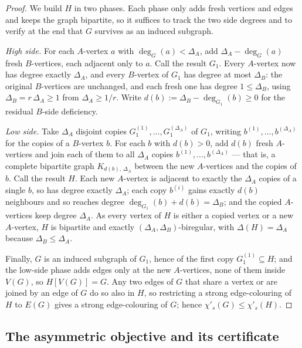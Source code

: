 \documentclass[11pt,a4paper]{article}
\theoremstyle{definition}
\theoremstyle{remark}
\begin{document}
\begin{proof}
We build $H$ in two phases. Each phase only adds fresh vertices and
edges and keeps the graph bipartite, so it suffices to track the two
side degrees and to verify at the end that $G$ survives as an induced
subgraph.

\emph{High side.} For each $A$-vertex $a$ with $\deg_G(a) < \Delta_A$,
add $\Delta_A - \deg_G(a)$ fresh $B$-vertices, each adjacent only to
$a$. Call the result $G_1$. Every $A$-vertex now has degree exactly
$\Delta_A$, and every $B$-vertex of $G_1$ has degree at most
$\Delta_B$: the original $B$-vertices are unchanged, and each fresh one
has degree $1 \leq \Delta_B$, using $\Delta_B = r\,\Delta_A \geq 1$ from
$\Delta_A \geq 1/r$. Write $d(b) := \Delta_B - \deg_{G_1}(b) \geq 0$ for
the residual $B$-side deficiency.

\emph{Low side.} Take $\Delta_A$ disjoint copies
$G_1^{(1)}, \dots, G_1^{(\Delta_A)}$ of $G_1$, writing
$b^{(1)}, \dots, b^{(\Delta_A)}$ for the copies of a $B$-vertex $b$. For
each $b$ with $d(b) > 0$, add $d(b)$ fresh $A$-vertices and join each of
them to all $\Delta_A$ copies $b^{(1)}, \dots, b^{(\Delta_A)}$ --- that
is, a complete bipartite graph $K_{d(b),\,\Delta_A}$ between the new
$A$-vertices and the copies of $b$. Call the result $H$. Each new
$A$-vertex is adjacent to exactly the $\Delta_A$ copies of a single $b$,
so has degree exactly $\Delta_A$; each copy $b^{(i)}$ gains exactly
$d(b)$ neighbours and so reaches degree
$\deg_{G_1}(b) + d(b) = \Delta_B$; and the copied $A$-vertices keep
degree $\Delta_A$. As every vertex of $H$ is either a copied vertex or a
new $A$-vertex, $H$ is bipartite and exactly
$(\Delta_A, \Delta_B)$-biregular, with $\Delta(H) = \Delta_A$ because
$\Delta_B \leq \Delta_A$.

Finally, $G$ is an induced subgraph of $G_1$, hence of the first copy
$G_1^{(1)} \subseteq H$; and the low-side phase adds edges only at the
new $A$-vertices, none of them inside $V(G)$, so $H[V(G)] = G$. Any two
edges of $G$ that share a vertex or are joined by an edge of $G$ do so
also in $H$, so restricting a strong edge-colouring of $H$ to $E(G)$
gives a strong edge-colouring of $G$; hence $\chi'_s(G) \leq \chi'_s(H)$.
\end{proof}

\subsection{The asymmetric objective and its certificate}
\label{sec:asym-objective}
\end{document}

